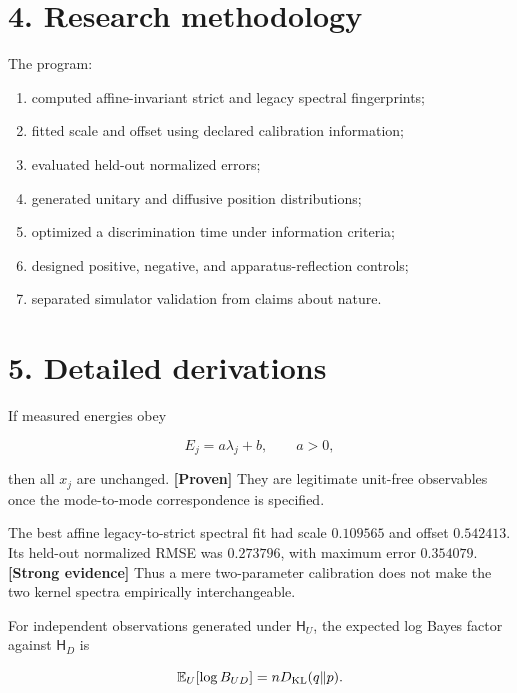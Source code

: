 \documentclass[11pt,a4paper,openany]{report}
\newcommand{\statusProven}{\textcolor{fingreen}{[Proven]}}
\newcommand{\statusStrong}{\textcolor{finblue}{[Strong evidence]}}
\begin{document}
\section{4. Research methodology}

The program:

\begin{enumerate}
\item 
computed affine-invariant strict and legacy spectral fingerprints;

\item 
fitted scale and offset using declared calibration information;

\item 
evaluated held-out normalized errors;

\item 
generated unitary and diffusive position distributions;

\item 
optimized a discrimination time under information criteria;

\item 
designed positive, negative, and apparatus-reflection controls;

\item 
separated simulator validation from claims about nature.

\end{enumerate}

\section{5. Detailed derivations}

If measured energies obey

\[
E_j=a\lambda_j+b,
\qquad a>0,
\]

then all \(x_j\) are unchanged. \textbf{\statusProven{}} They are legitimate unit-free observables once the mode-to-mode correspondence is specified.

The best affine legacy-to-strict spectral fit had scale \(0.109565\) and offset \(0.542413\). Its held-out normalized RMSE was \(0.273796\), with maximum error \(0.354079\). \textbf{\statusStrong{}} Thus a mere two-parameter calibration does not make the two kernel spectra empirically interchangeable.

For independent observations generated under \(\mathsf H_U\), the expected log Bayes factor against \(\mathsf H_D\) is

\[
\mathbb E_U[\log B_{UD}]
=nD_{\rm KL}(q\|p).
\]
\end{document}
